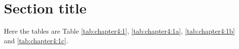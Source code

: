\documentclass[a4paper]{article}
\begin{document}
\section{Section title}

\begin{table}[h!]
\centering
{}
\caption{Testing}
\label{tab:chapter4:1}
\end{table}

Here the tables are Table \ref{tab:chapter4:1}, \ref{tab:chapter4:1a}, \ref{tab:chapter4:1b} and \ref{tab:chapter4:1c}.
\end{document}
